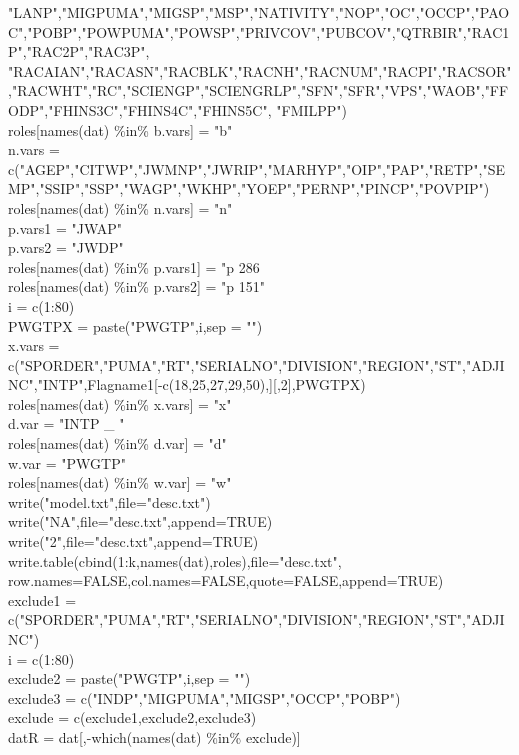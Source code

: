 \documentclass[12pt]{article}
\begin{document}
           "LANP","MIGPUMA","MIGSP","MSP","NATIVITY","NOP","OC","OCCP","PAOC","POBP","POWPUMA","POWSP","PRIVCOV","PUBCOV","QTRBIR","RAC1P","RAC2P","RAC3P",
           "RACAIAN","RACASN","RACBLK","RACNH","RACNUM","RACPI","RACSOR","RACWHT","RC","SCIENGP","SCIENGRLP","SFN","SFR","VPS","WAOB","FFODP","FHINS3C","FHINS4C","FHINS5C",
           "FMILPP") \\
roles[names(dat) \%in\% b.vars] = "b"\\
n.vars = c("AGEP","CITWP","JWMNP","JWRIP","MARHYP","OIP","PAP","RETP","SEMP","SSIP","SSP","WAGP","WKHP","YOEP","PERNP","PINCP","POVPIP") \\
roles[names(dat) \%in\% n.vars] = "n"\\
p.vars1 = "JWAP"\\
p.vars2 = "JWDP"\\
roles[names(dat) \%in\% p.vars1] = "p 286\\
roles[names(dat) \%in\% p.vars2] = "p 151"\\
i = c(1:80)\\
PWGTPX = paste("PWGTP",i,sep = "")\\
x.vars = c("SPORDER","PUMA","RT","SERIALNO","DIVISION","REGION","ST","ADJINC","INTP",Flagname1[-c(18,25,27,29,50),][,2],PWGTPX) \\
roles[names(dat) \%in\% x.vars] = "x"\\
d.var = "INTP \_ "\\
roles[names(dat) \%in\% d.var] = "d"\\
w.var = "PWGTP"\\
roles[names(dat) \%in\% w.var] = "w"\\
write("model.txt",file="desc.txt") \\
write("NA",file="desc.txt",append=TRUE) \\
write("2",file="desc.txt",append=TRUE) \\
write.table(cbind(1:k,names(dat),roles),file="desc.txt",\\
            row.names=FALSE,col.names=FALSE,quote=FALSE,append=TRUE)\\
exclude1 = c("SPORDER","PUMA","RT","SERIALNO","DIVISION","REGION","ST","ADJINC")\\
i = c(1:80)\\
exclude2 = paste("PWGTP",i,sep = "")\\
exclude3 = c("INDP","MIGPUMA","MIGSP","OCCP","POBP")\\
exclude = c(exclude1,exclude2,exclude3)\\
datR = dat[,-which(names(dat) \%in\% exclude)]\\
\end{document}
